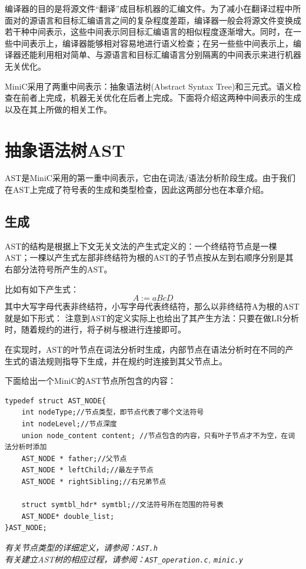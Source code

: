 编译器的目的是将源文件“翻译”成目标机器的汇编文件。为了减小在翻译过程中所面对的源语言和目标汇编语言之间的复杂程度差距，编译器一般会将源文件变换成若干种中间表示，这些中间表示同目标汇编语言的相似程度逐渐增大。同时，在一些中间表示上，编译器能够相对容易地进行语义检查；在另一些些中间表示上，编译器还能利用相对简单、与源语言和目标汇编语言分别隔离的中间表示来进行机器无关优化。

MiniC采用了两重中间表示：抽象语法树(Abstract Syntax Tree)和三元式。语义检查在前者上完成，机器无关优化在后者上完成。下面将介绍这两种中间表示的生成以及在其上所做的相关工作。

\section{抽象语法树AST}
\label{AST}
AST是MiniC采用的第一重中间表示，它由在词法/语法分析阶段生成。由于我们在AST上完成了符号表的生成和类型检查，因此这两部分也在本章介绍。
\subsection{生成}
\label{genAST}
AST的结构是根据上下文无关文法的产生式定义的：一个终结符节点是一棵AST；一棵以产生式左部非终结符为根的AST的子节点按从左到右顺序分别是其右部分法符号所产生的AST。

比如有如下产生式：
\begin{displaymath}
	A:=aBcD
\end{displaymath}
其中大写字母代表非终结符，小写字母代表终结符，那么以非终结符A为根的AST就是如下形式：
注意到AST的定义实际上也给出了其产生方法：只要在做LR分析时，随着规约的进行，将子树与根进行连接即可。

在实现时，AST的叶节点在词法分析时生成，内部节点在语法分析时在不同的产生式的语法规则指导下生成，并在规约时连接到其父节点上。

下面给出一个MiniC的AST节点所包含的内容：
\label{ASTnode}
\begin{lstlisting}
typedef struct AST_NODE{
  	int nodeType;//节点类型，即节点代表了哪个文法符号
  	int nodeLevel;//节点深度
	union node_content content; //节点包含的内容，只有叶子节点才不为空，在词法分析时添加
  	AST_NODE * father;//父节点
  	AST_NODE * leftChild;//最左子节点
  	AST_NODE * rightSibling;//右兄弟节点

	struct symtbl_hdr* symtbl;//文法符号所在范围的符号表
	AST_NODE* double_list;
}AST_NODE;
\end{lstlisting}
{\it \anchor 有关节点类型的详细定义，请参阅：\verb|AST.h|}\\
{\it \anchor 有关建立AST树的相应过程，请参阅：\verb|AST_operation.c|, \verb|minic.y|}\\
